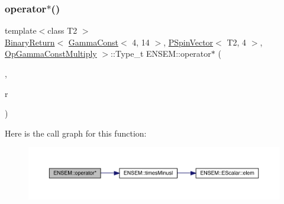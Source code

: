 \subsubsection{\texorpdfstring{operator$\ast$()}{operator*()}\hspace{0.1cm}{\footnotesize\ttfamily [15/32]}}
{\footnotesize\ttfamily template$<$class T2 $>$ \\
\mbox{\hyperlink{structENSEM_1_1BinaryReturn}{Binary\+Return}}$<$ \mbox{\hyperlink{classENSEM_1_1GammaConst}{Gamma\+Const}}$<$ 4, 14 $>$, \mbox{\hyperlink{classENSEM_1_1PSpinVector}{P\+Spin\+Vector}}$<$ T2, 4 $>$, \mbox{\hyperlink{structENSEM_1_1OpGammaConstMultiply}{Op\+Gamma\+Const\+Multiply}} $>$\+::Type\+\_\+t E\+N\+S\+E\+M\+::operator$\ast$ (\begin{DoxyParamCaption}\item[{const \mbox{\hyperlink{classENSEM_1_1GammaConst}{Gamma\+Const}}$<$ 4, 14 $>$ \&}]{,  }\item[{const \mbox{\hyperlink{classENSEM_1_1PSpinVector}{P\+Spin\+Vector}}$<$ T2, 4 $>$ \&}]{r }\end{DoxyParamCaption})\hspace{0.3cm}{\ttfamily [inline]}}

Here is the call graph for this function\+:\nopagebreak
\begin{figure}[H]
\begin{center}
\leavevmode
\includegraphics[width=350pt]{dd/d6d/group__primspinvector_ga890c8e465f4d1855cc9aa62f066b5679_cgraph}
\end{center}
\end{figure}
\mbox{\label{group__primspinvector_ga66707f89120c5b6f17816a485d9900eb}} 
